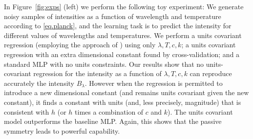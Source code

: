 \documentclass[preprint]{article} %
\newcommand{\figref}[1]{Figure~\ref{#1}}
\begin{document}
In \figref{fig:exps} (left) we perform the following toy experiment:
We generate noisy samples of intensities as a function of wavelength and temperature according to \eqref{eq.planck}, and the learning task is to predict the intensity for different values of wavelengths and temperatures.
We perform a units covariant regression (employing the approach of \citealt{villar2022dimensionless}) using only $\lambda, T, c, k$; a units covariant regression with an extra dimensional constant found by cross-validation; and a standard MLP with no units constraints.
Our results show that no units-covariant regression for the intensity as a function of $\lambda, T, c, k$ can reproduce accurately the intensity $B_\lambda$. However when the regression is permitted to introduce a new dimensional constant (and remains units covariant given the new constant), it finds a constant with units (and, less precisely, magnitude) that is consistent with $h$ (or $h$ times a combination of $c$ and $k$). The units covariant model outperforms the baseline MLP. Again, this shows that the passive symmetry leads to powerful capability.
\end{document}
